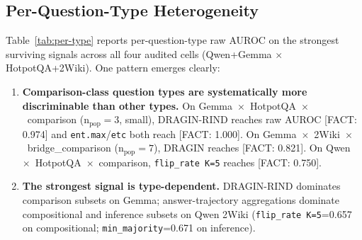 \documentclass[11pt]{article}
\newcommand{\FACT}[1]{{\color{blue}\textsf{[FACT: #1]}}}
\begin{document}
\subsection{Per-Question-Type Heterogeneity}
\label{sec:per-type}

Table~\ref{tab:per-type} reports per-question-type raw AUROC on the strongest
surviving signals across all four audited cells (Qwen+Gemma $\times$
HotpotQA+2Wiki). One pattern emerges clearly:

\begin{enumerate}
\item \textbf{Comparison-class question types are systematically more
discriminable than other types.} On Gemma~$\times$~HotpotQA~$\times$~comparison
(n$_{\text{pop}}{=}3$, small), DRAGIN-RIND reaches raw AUROC \FACT{0.974} and
\texttt{ent.max}/\texttt{etc} both reach \FACT{1.000}. On
Gemma~$\times$~2Wiki~$\times$~bridge\_comparison (n$_{\text{pop}}{=}7$),
DRAGIN reaches \FACT{0.821}. On Qwen~$\times$~HotpotQA~$\times$~comparison,
\texttt{flip\_rate K=5} reaches \FACT{0.750}.
\item \textbf{The strongest signal is type-dependent.} DRAGIN-RIND dominates
comparison subsets on Gemma; answer-trajectory aggregations dominate
compositional and inference subsets on Qwen 2Wiki (\texttt{flip\_rate
K=5}{=}0.657 on compositional; \texttt{min\_majority}{=}0.671 on inference).
\end{enumerate}
\end{document}
